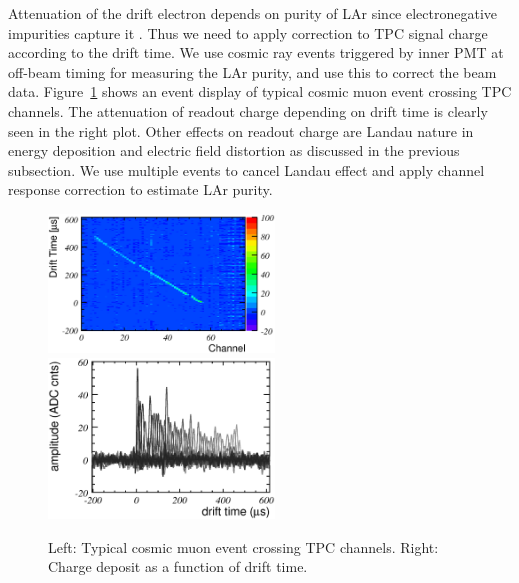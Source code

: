 Attenuation of the drift electron depends on purity of LAr since electronegative impurities capture it \cite{purity}. 
Thus we need to apply correction to TPC signal charge according to the drift time.
We use cosmic ray events triggered by inner PMT at off-beam timing for measuring the LAr purity, and use this to correct the beam data.
Figure~\ref{fig:CosmicEvent} shows an event display of typical cosmic muon event crossing TPC channels.
The attenuation of readout charge depending on drift time is clearly seen in the right plot. 
Other effects on readout charge are Landau nature in energy deposition and electric field distortion as discussed in the previous subsection.
We use multiple events to cancel Landau effect and apply channel response correction to estimate LAr purity.


\begin{figure}[htbp]
 \begin{center}
  \includegraphics[width=60mm]{fig/cosmic68_ev258_display.eps}
  \includegraphics[width=60mm]{fig/cosmic68_ev258.eps}
 \end{center}
 \caption{Left: Typical cosmic muon event crossing TPC channels. Right: Charge deposit as a function of drift time.}
 \label{fig:CosmicEvent}
\end{figure}

